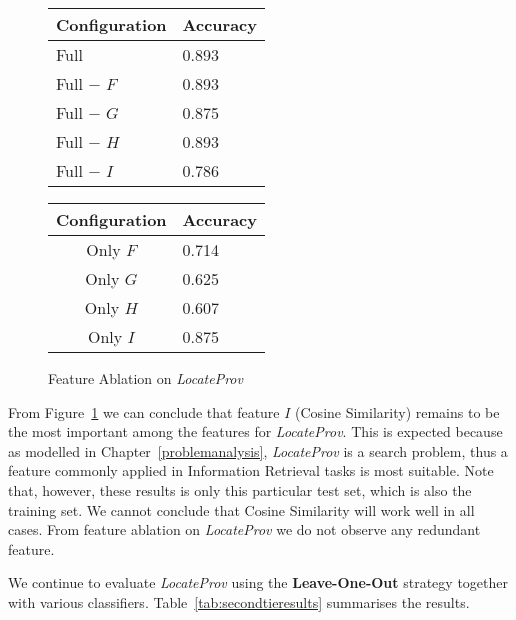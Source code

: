 \begin{figure}[ht]
\begin{minipage}[b]{0.45\linewidth}\centering
\begin{tabular}{ l | l }
Configuration & Accuracy \\
\hline
Full			& 0.893 \\
Full $-$ $F$	& 0.893 \\
Full $-$ $G$	& 0.875 \\
Full $-$ $H$	& 0.893 \\
Full $-$ $I$	& 0.786 \\
\end{tabular}
\end{minipage}
\hspace{0.5cm}
\begin{minipage}[b]{0.45\linewidth}\centering
\begin{tabular}{ c | l }
Configuration & Accuracy \\
\hline
Only $F$	& 0.714 \\
Only $G$	& 0.625 \\
Only $H$	& 0.607 \\
Only $I$	& 0.875 \\
\end{tabular}
\end{minipage}
\caption{Feature Ablation on {\it LocateProv}}
\label{fig:ablation_second}
\end{figure}
From Figure~\ref{fig:ablation_second} we can conclude that feature $I$ (Cosine Similarity) remains to be the most important among the features for \textit{LocateProv}. This is expected because as modelled in Chapter~\ref{problemanalysis}, \textit{LocateProv} is a search problem, thus a feature commonly applied in Information Retrieval tasks is most suitable. Note that, however, these results is only this particular test set, which is also the training set. We cannot conclude that Cosine Similarity will work well in all cases. From feature ablation on \textit{LocateProv} we do not observe any redundant feature.

We continue to evaluate \textit{LocateProv} using the \textbf{Leave-One-Out} strategy together with various classifiers. Table~\ref{tab:secondtieresults} summarises the results.

